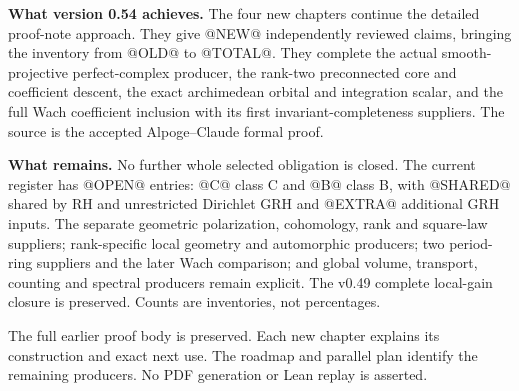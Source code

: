 \textbf{What version 0.54 achieves.}
The four new chapters continue the detailed proof-note approach.
They give @NEW@ independently reviewed claims, bringing the inventory
from @OLD@ to @TOTAL@. They complete the actual smooth-projective
perfect-complex producer, the rank-two preconnected core and coefficient
descent, the exact archimedean orbital and integration scalar, and
the full Wach coefficient inclusion with its first invariant-completeness
suppliers. The source is the accepted Alpoge--Claude formal proof.

\medskip
\textbf{What remains.}
No further whole selected obligation is closed. The current register has
@OPEN@ entries: @C@ class C and @B@ class B, with @SHARED@ shared by
RH and unrestricted Dirichlet GRH and @EXTRA@ additional GRH inputs.
The separate geometric polarization, cohomology, rank and square-law
suppliers; rank-specific local geometry and automorphic producers;
two period-ring suppliers and the later Wach comparison; and global
volume, transport, counting and spectral producers remain explicit.
The v0.49 complete local-gain closure is preserved.
Counts are inventories, not percentages.

\medskip
The full earlier proof body is preserved. Each new chapter explains its
construction and exact next use. The roadmap and parallel plan identify
the remaining producers. No PDF generation or Lean replay is asserted.

